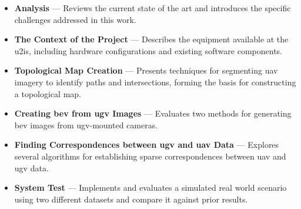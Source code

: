 \begin{itemize}
    \item \textbf{Analysis} --- Reviews the current state of the art and introduces the specific challenges addressed in this work.
    \item \textbf{The Context of the Project} --- Describes the equipment available at the \gls{u2is}, including hardware configurations and existing software components.
    \item \textbf{Topological Map Creation} --- Presents techniques for segmenting \gls{uav} imagery to identify paths and intersections, forming the basis for constructing a topological map.
    \item \textbf{Creating \gls{bev} from \gls{ugv} Images} --- Evaluates two methods for generating \gls{bev} images from \gls{ugv}-mounted cameras.
    \item \textbf{Finding Correspondences between \gls{ugv} and \gls{uav} Data} --- Explores several algorithms for establishing sparse correspondences between \gls{uav} and \gls{ugv} data.
    \item \textbf{System Test} --- Implements and evaluates a simulated real world
    scenario using two different datasets and compare it against prior results.
\end{itemize}


